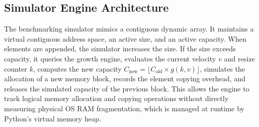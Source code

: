 \subsection{Simulator Engine Architecture}
The benchmarking simulator mimics a contiguous dynamic array. It maintains a 
virtual contiguous address space, an active size, and an active capacity. When 
elements are appended, the simulator increases the size. If the size exceeds 
capacity, it queries the growth engine, evaluates the current velocity $v$ and 
resize counter $k$, computes the new capacity $C_{\text{new}} = \lfloor C_{\text{old}} \times g(k,v) \rfloor$, 
simulates the allocation of a new memory block, records the element copying 
overhead, and releases the simulated capacity of the previous block. This allows the 
engine to track logical memory allocation and copying operations without directly 
measuring physical OS RAM fragmentation, which is managed at runtime by Python's 
virtual memory heap.

